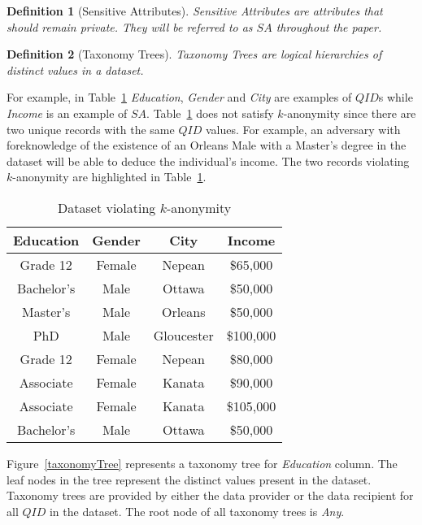 \documentclass[11pt]{article}       %
\newtheorem{definition}{Definition}
\begin{document}
\begin{definition}[Sensitive Attributes] 
Sensitive Attributes are attributes that should remain private. They will be referred to as $SA$ throughout the paper.
\end{definition}

\begin{definition}[Taxonomy Trees]
Taxonomy Trees are logical hierarchies of distinct values in a dataset.
\end{definition}

For example, in Table~\ref{table1} \emph{Education}, \emph{Gender} and \emph{City} are examples of $QID$s while \emph{Income} is an example of $SA$. Table~\ref{table1} does not satisfy $k$-anonymity since there are two unique records with the same $QID$ values. For example, an adversary with foreknowledge of the existence of an Orleans Male with a Master's degree in the dataset will be able to deduce the individual's income. The two records violating $k$-anonymity are highlighted in Table~\ref{table1}.

\begin{table}[htp]
\begin{center}
\begin{tabular}{|c|c|c|c|}
\hline
Education & Gender & City & Income \\
\hline
Grade 12 & Female & Nepean & \$65,000 \\
Bachelor's & Male & Ottawa & \$50,000 \\
\rowcolor [HTML]{EAECEE} Master’s & Male & Orleans & \$50,000 \\
\rowcolor [HTML]{EAECEE} PhD & Male & Gloucester & \$100,000 \\
Grade 12 & Female & Nepean & \$80,000 \\
Associate & Female & Kanata & \$90,000 \\
Associate & Female & Kanata & \$105,000 \\
Bachelor's & Male & Ottawa & \$50,000 \\
\hline
\end{tabular}
\end{center}
\label{table1}
\caption{Dataset violating $k$-anonymity}
\end{table}

Figure~\ref{taxonomyTree} represents a taxonomy tree for \emph{Education} column. The leaf nodes in the tree represent the distinct values present in the dataset. Taxonomy trees are provided by either the data provider or the data recipient for all $QID$ in the dataset. The root node of all taxonomy trees is \emph{Any}.
\end{document}
